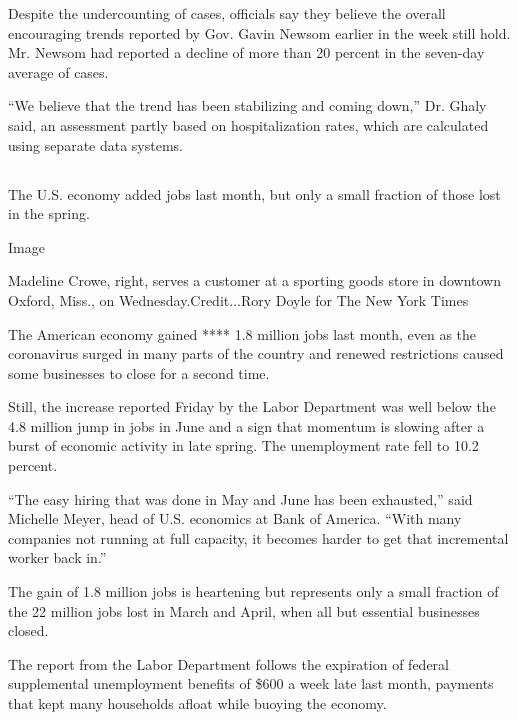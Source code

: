 Despite the undercounting of cases, officials say they believe the
overall encouraging trends reported by Gov. Gavin Newsom earlier in the
week still hold. Mr. Newsom had reported a decline of more than 20
percent in the seven-day average of cases.

``We believe that the trend has been stabilizing and coming down,'' Dr.
Ghaly said, an assessment partly based on hospitalization rates, which
are calculated using separate data systems.

\hypertarget{-3}{%
\subsection{}\label{-3}}

The U.S. economy added jobs last month, but only a small fraction of
those lost in the spring.

Image

Madeline Crowe, right, serves a customer at a sporting goods store in
downtown Oxford, Miss., on Wednesday.Credit...Rory Doyle for The New
York Times

The American economy gained **** 1.8 million jobs last month, even as
the coronavirus surged in many parts of the country and renewed
restrictions caused some businesses to close for a second time.

Still, the increase reported Friday by the Labor Department was well
below the 4.8 million jump in jobs in June and a sign that momentum is
slowing after a burst of economic activity in late spring. The
unemployment rate fell to 10.2 percent.

``The easy hiring that was done in May and June has been exhausted,''
said Michelle Meyer, head of U.S. economics at Bank of America. ``With
many companies not running at full capacity, it becomes harder to get
that incremental worker back in.''

The gain of 1.8 million jobs is heartening but represents only a small
fraction of the 22 million jobs lost in March and April, when all but
essential businesses closed.

The report from the Labor Department follows the expiration of federal
supplemental unemployment benefits of \$600 a week late last month,
payments that kept many households afloat while buoying the economy.

\hypertarget{-4}{%
\subsection{}\label{-4}}

